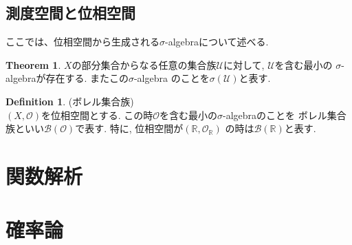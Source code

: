 \documentclass[11pt, a4paper, dvipdfmx]{jsbook}
\theoremstyle{definition}
\newtheorem{Definition+}[Axiom+]{Definition}
\newtheorem{Theorem+}[Axiom+]{Theorem}
\newcommand{\R}{\mathbb{R}}
\begin{document}
\section{測度空間と位相空間}
ここでは、位相空間から生成される$\sigma$-algebraについて述べる. 
\begin{Theorem+}
  $X$の部分集合からなる任意の集合族$\mathscr{U}$に対して, $\mathscr{U}$を含む最小の
  $\sigma$-algebraが存在する. またこの$\sigma$-algebra のことを$\sigma(\mathscr{U})$と表す.
\end{Theorem+}
\begin{Definition+}(ボレル集合族)\\
  $(X, \mathscr{O})$を位相空間とする. この時$\mathscr{O}$を含む最小の$\sigma$-algebraのことを
  ボレル集合族といい$\mathcal{B}(\mathscr{O})$で表す. 特に, 位相空間が$(\R, \mathscr{O}_{\R})$
  の時は$\mathcal{B}(\mathscr{\R})$と表す.
\end{Definition+}

\chapter{関数解析}
\chapter{確率論}
\end{document}
